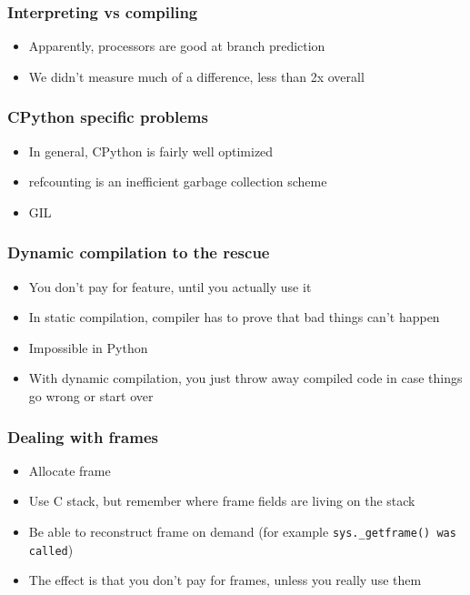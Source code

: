 \documentclass[utf8x]{beamer}
\begin{document}
\begin{frame}
  \frametitle{Interpreting vs compiling}
  \begin{itemize}
    \item Apparently, processors are good at branch prediction
    \item We didn't measure much of a difference, less than 2x overall
  \end{itemize}
\end{frame}

\begin{frame}
  \frametitle{CPython specific problems}
  \begin{itemize}
    \item In general, CPython is fairly well optimized
    \item refcounting is an inefficient garbage collection scheme
    \item GIL
  \end{itemize}
\end{frame}

\begin{frame}
  \frametitle{Dynamic compilation to the rescue}
  \begin{itemize}
    \item You don't pay for feature, until you actually use it
    \item In static compilation, compiler has to prove that bad
      things can't happen
    \item Impossible in Python
    \item With dynamic compilation, you just throw away compiled
      code in case things go wrong or start over
  \end{itemize}
\end{frame}

\begin{frame}
  \frametitle{Dealing with frames}
  \begin{itemize}
    \item Allocate frame
      \pause
    \item Use C stack, but remember where frame fields are
      living on the stack
      \pause
    \item Be able to reconstruct frame on demand (for example
      {\tt sys.\_getframe() was called})
      \pause
    \item The effect is that you don't pay for frames, unless
      you really use them
  \end{itemize}
\end{frame}
\end{document}
